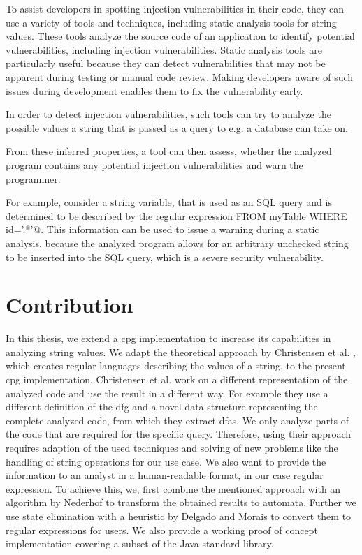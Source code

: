 To assist developers in spotting injection vulnerabilities in their code, they can use a variety of tools and techniques, including static analysis tools for string values. These tools analyze the source code of an application to identify potential vulnerabilities, including injection vulnerabilities. Static analysis tools are particularly useful because they can detect vulnerabilities that may not be apparent during testing or manual code review. Making developers aware of such issues during development enables them to fix the vulnerability early.

In order to detect injection vulnerabilities, such tools can try to analyze the possible values a string that is passed as a query to e.g. a database can take on.

From these inferred properties, a tool can then assess, whether the analyzed program contains any potential injection vulnerabilities and warn the programmer.

For example, consider a string variable, that is used as an SQL query and is determined to be described by the regular expression \Verb@DELETE \* FROM myTable WHERE id='.*'@.
This information can be used to issue a warning during a static analysis, because the analyzed program allows for an arbitrary unchecked string to be inserted into the SQL query, which is a severe security vulnerability.

\section{Contribution}

In this thesis, we extend a \acf{cpg} implementation \cite{cpg} to increase its capabilities in analyzing string values. We adapt the theoretical approach by Christensen et al. \cite{brics}, which creates regular languages describing the values of a string, to the present \ac{cpg} implementation. Christensen et al. work on a different representation of the analyzed code and use the result in a different way. For example they use a different definition of the \ac{dfg} and a novel data structure representing the complete analyzed code, from which they extract \acp{dfa}. We only analyze parts of the code that are required for the specific query. Therefore, using their approach requires adaption of the used techniques and solving of new problems like the handling of string operations for our use case. We also want to provide the information to an analyst in a human-readable format, in our case regular expression.
To achieve this, we, first combine the mentioned approach with an algorithm by Nederhof \cite{nederhof} to transform the obtained results to automata. Further we use state elimination with a heuristic by Delgado and Morais \cite{delgado} to convert them to regular expressions for users. We also provide a working proof of concept implementation covering a subset of the Java standard library.

